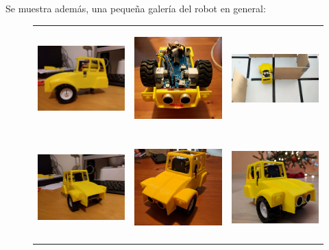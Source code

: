 Se muestra además, una pequeña galería del robot en general:

\begin{figure}[h!]
\centering
\begin{tabular}{ccc}
  \includegraphics[width=150px, height=150px]{img/Caprito2.jpg}
&
  \includegraphics[width=150px, height=150px]{img/Caprito6.jpg}
  &
  \includegraphics[width=150px, height=150px]{img/Caprito4.jpg}\\
  \includegraphics[width=150px, height=150px]{img/Caprito5.jpg}
  &
  \includegraphics[width=150px, height=150px]{img/Caprito7.jpg}
  &
  \includegraphics[width=150px, height=150px]{img/Caprito8.jpg}\\


\end{tabular}
\end{figure}
